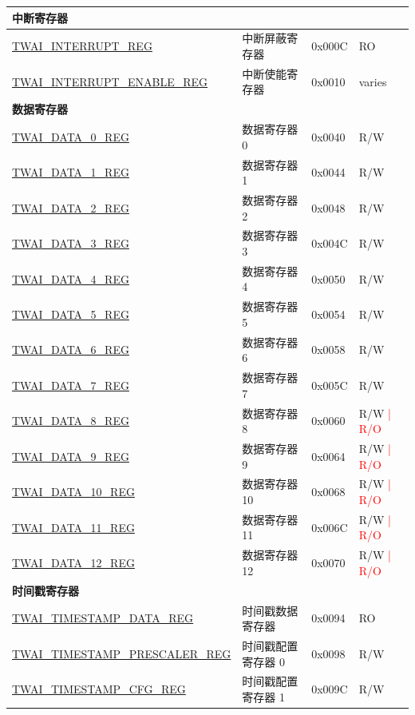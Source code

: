 \begin{longtable}{ | p{6cm} | p{5.2cm} | p{1.3cm} | p{2cm} | }
\multicolumn{4}{|l|}{\textbf{中断寄存器}} \\ \hline
\hyperref[regdesc:TWAIINTERRUPTREG]{TWAI\_INTERRUPT\_REG} & 中断屏蔽寄存器 & 0x000C & RO \\ \hline
\hyperref[regdesc:TWAIINTERRUPTENABLEREG]{TWAI\_INTERRUPT\_ENABLE\_REG} & 中断使能寄存器 & 0x0010 & varies \\ \hline
\multicolumn{4}{|l|}{\textbf{数据寄存器}} \\ \hline
\hyperref[regdesc:TWAIDATA0REG]{TWAI\_DATA\_0\_REG} & 数据寄存器 0 & 0x0040 & R/W \\ \hline
\hyperref[regdesc:TWAIDATA1REG]{TWAI\_DATA\_1\_REG} & 数据寄存器 1 & 0x0044 & R/W \\ \hline
\hyperref[regdesc:TWAIDATA2REG]{TWAI\_DATA\_2\_REG} & 数据寄存器 2 & 0x0048 & R/W \\ \hline
\hyperref[regdesc:TWAIDATA3REG]{TWAI\_DATA\_3\_REG} & 数据寄存器 3 & 0x004C & R/W \\ \hline
\hyperref[regdesc:TWAIDATA4REG]{TWAI\_DATA\_4\_REG} & 数据寄存器 4 & 0x0050 & R/W \\ \hline
\hyperref[regdesc:TWAIDATA5REG]{TWAI\_DATA\_5\_REG} & 数据寄存器 5 & 0x0054 & R/W \\ \hline
\hyperref[regdesc:TWAIDATA6REG]{TWAI\_DATA\_6\_REG} & 数据寄存器 6 & 0x0058 & R/W \\ \hline
\hyperref[regdesc:TWAIDATA7REG]{TWAI\_DATA\_7\_REG} & 数据寄存器 7 & 0x005C & R/W \\ \hline
\hyperref[regdesc:TWAIDATA8REG]{TWAI\_DATA\_8\_REG} & 数据寄存器 8 & 0x0060 & R/W \textcolor{red}{| R/O} \\ \hline
\hyperref[regdesc:TWAIDATA9REG]{TWAI\_DATA\_9\_REG} & 数据寄存器 9 & 0x0064 & R/W \textcolor{red}{| R/O} \\ \hline
\hyperref[regdesc:TWAIDATA10REG]{TWAI\_DATA\_10\_REG} & 数据寄存器 10 & 0x0068 & R/W \textcolor{red}{| R/O} \\ \hline
\hyperref[regdesc:TWAIDATA11REG]{TWAI\_DATA\_11\_REG} & 数据寄存器 11 & 0x006C & R/W \textcolor{red}{| R/O} \\ \hline
\hyperref[regdesc:TWAIDATA12REG]{TWAI\_DATA\_12\_REG} & 数据寄存器 12 & 0x0070 & R/W \textcolor{red}{| R/O} \\ \hline
\multicolumn{4}{|l|}{\textbf{时间戳寄存器}} \\ \hline
\hyperref[regdesc:TWAITIMESTAMPDATAREG]{TWAI\_TIMESTAMP\_DATA\_REG} & 时间戳数据寄存器 & 0x0094 & RO \\ \hline
\hyperref[regdesc:TWAITIMESTAMPPRESCALERREG]{TWAI\_TIMESTAMP\_PRESCALER\_REG} & 时间戳配置寄存器 0 & 0x0098 & R/W \\ \hline
\hyperref[regdesc:TWAITIMESTAMPCFGREG]{TWAI\_TIMESTAMP\_CFG\_REG} & 时间戳配置寄存器 1 & 0x009C & R/W \\ \hline
\end{longtable}
